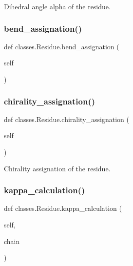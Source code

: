 \begin{DoxyVerb}Dihedral angle alpha of the residue.\end{DoxyVerb}
 \mbox{\label{classclasses_1_1Residue_af3fc218f944917d3a829fab3399622d3}} 
\subsubsection{\texorpdfstring{bend\+\_\+assignation()}{bend\_assignation()}}
{\footnotesize\ttfamily def classes.\+Residue.\+bend\+\_\+assignation (\begin{DoxyParamCaption}\item[{}]{self }\end{DoxyParamCaption})}

\mbox{\label{classclasses_1_1Residue_ae037ce1cf5096a0f9a866e48a3de033b}} 
\subsubsection{\texorpdfstring{chirality\+\_\+assignation()}{chirality\_assignation()}}
{\footnotesize\ttfamily def classes.\+Residue.\+chirality\+\_\+assignation (\begin{DoxyParamCaption}\item[{}]{self }\end{DoxyParamCaption})}

\begin{DoxyVerb}Chirality assignation of the residue.\end{DoxyVerb}
 \mbox{\label{classclasses_1_1Residue_ab4977c936312bc08a4e610eafb4036e6}} 
\subsubsection{\texorpdfstring{kappa\+\_\+calculation()}{kappa\_calculation()}}
{\footnotesize\ttfamily def classes.\+Residue.\+kappa\+\_\+calculation (\begin{DoxyParamCaption}\item[{}]{self,  }\item[{}]{chain }\end{DoxyParamCaption})}

